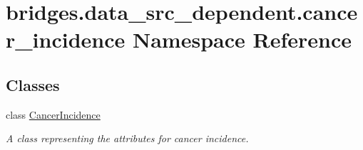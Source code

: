 \hypertarget{namespacebridges_1_1data__src__dependent_1_1cancer__incidence}{}\section{bridges.\+data\+\_\+src\+\_\+dependent.\+cancer\+\_\+incidence Namespace Reference}
\label{namespacebridges_1_1data__src__dependent_1_1cancer__incidence}
\subsection*{Classes}
\begin{DoxyCompactItemize}
\item 
class \hyperlink{classbridges_1_1data__src__dependent_1_1cancer__incidence_1_1_cancer_incidence}{Cancer\+Incidence}
\begin{DoxyCompactList}\small\item\em A class representing the attributes for cancer incidence. \end{DoxyCompactList}\end{DoxyCompactItemize}
